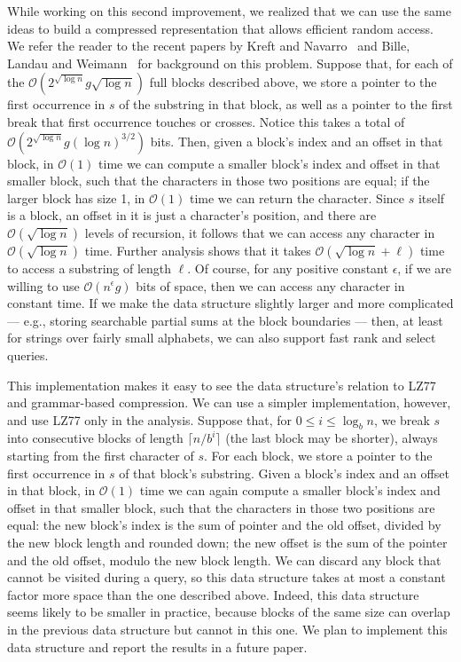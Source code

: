 \documentclass[runningheads]{llncs}
\newcommand{\Oh}[1]
    {\ensuremath{\mathcal{O}\!\left( {#1} \right)}}
\begin{document}
While working on this second improvement, we realized that we can use the same ideas to build a compressed representation that allows efficient random access.  We refer the reader to the recent papers by Kreft and Navarro~\cite{KN10} and Bille, Landau and Weimann~\cite{BLW10} for background on this problem.  Suppose that, for each of the $\Oh{2^{\sqrt{\log n}} g \sqrt{\log n}}$ full blocks described above, we store a pointer to the first occurrence in $s$ of the substring in that block, as well as a pointer to the first break that first occurrence touches or crosses.  Notice this takes a total of $\Oh{2^{\sqrt{\log n}} g (\log n)^{3 / 2}}$ bits.  Then, given a block's index and an offset in that block, in $\Oh{1}$ time we can compute a smaller block's index and offset in that smaller block, such that the characters in those two positions are equal; if the larger block has size 1, in $\Oh{1}$ time we can return the character.  Since $s$ itself is a block, an offset in it is just a character's position, and there are $\Oh{\sqrt{\log n}}$ levels of recursion, it follows that we can access any character in $\Oh{\sqrt{\log n}}$ time.  Further analysis shows that it takes $\Oh{\sqrt{\log n} + \ell}$ time to access a substring of length $\ell$.  Of course, for any positive constant $\epsilon$, if we are willing to use $\Oh{n^{\epsilon} g}$ bits of space, then we can access any character in constant time.  If we make the data structure slightly larger and more complicated --- e.g., storing searchable partial sums at the block boundaries --- then, at least for strings over fairly small alphabets, we can also support fast rank and select queries.

This implementation makes it easy to see the data structure's relation to LZ77 and grammar-based compression.  We can use a simpler implementation, however, and use LZ77 only in the analysis.  Suppose that, for \(0 \leq i \leq \log_b n\), we break $s$ into consecutive blocks of length \(\lceil n / b^i \rceil\) (the last block may be shorter), always starting from the first character of $s$.  For each block, we store a pointer to the first occurrence in $s$ of that block's substring.  Given a block's index and an offset in that block, in $\Oh{1}$ time we can again compute a smaller block's index and offset in that smaller block, such that the characters in those two positions are equal: the new block's index is the sum of pointer and the old offset, divided by the new block length and rounded down; the new offset is the sum of the pointer and the old offset, modulo the new block length.  We can discard any block that cannot be visited during a query, so this data structure takes at most a constant factor more space than the one described above.  Indeed, this data structure seems likely to be smaller in practice, because blocks of the same size can overlap in the previous data structure but cannot in this one.  We plan to implement this data structure and report the results in a future paper.



\end{document}
